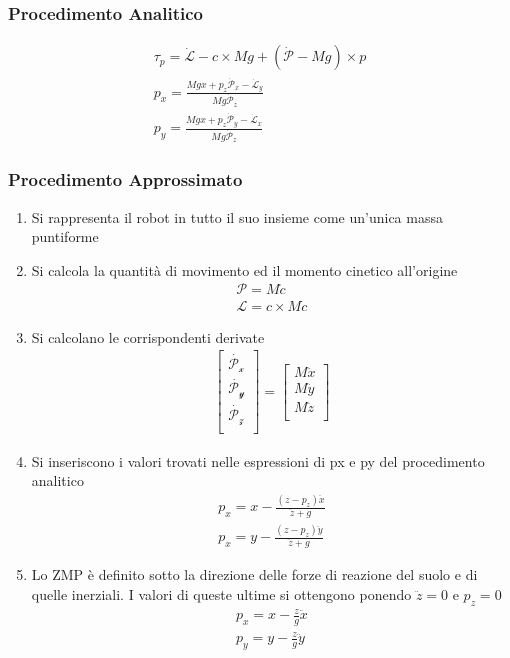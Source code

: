 \documentclass[a4paper,portrait,12pt]{article}
\theoremstyle{definition}
\begin{document}
\subsubsection{Procedimento Analitico}

\begin{align*}
\tau_p = \dot{\mathcal{L}} - c \times Mg + (\dot{\mathcal{P}} - Mg) \times p\\
p_x = \frac{Mgx + p_z\dot{\mathcal{P}}_x - \dot{\mathcal{L}}_y}{Mg \dot{\mathcal{P}}_z}\\
p_y = \frac{Mgx + p_z\dot{\mathcal{P}}_y - \dot{\mathcal{L}}_x}{Mg \dot{\mathcal{P}}_z}
\end{align*}

\subsubsection{Procedimento Approssimato}

\begin{enumerate}
\item Si rappresenta il robot in tutto il suo insieme come
un’unica massa puntiforme
\item Si calcola la quantità di movimento ed il momento
cinetico all’origine
\begin{align*}
\mathcal{P} = M \dot{c}\\
\mathcal{L} = c \times M \dot{c}
\end{align*}
\item Si calcolano le corrispondenti derivate
\begin{align*}
\left[\begin{array}{c}
\dot{\mathcal{P_x}}\\
\dot{\mathcal{P_y}}\\
\dot{\mathcal{P_z}}\\
\end{array}\right]
=
\left[\begin{array}{c}
M\ddot{x}\\
M\ddot{y}\\
M\ddot{z}\\
\end{array}\right]
\end{align*}
\item Si inseriscono i valori trovati nelle espressioni di px e py del
procedimento analitico
\begin{align*}
p_x = x - \frac{(z - p_z)\ddot{x}}{\ddot{z}+g}\\
p_x = y - \frac{(z - p_z)\ddot{y}}{\ddot{z}+g}
\end{align*}
\item Lo ZMP è definito sotto la direzione delle forze di reazione del
suolo e di quelle inerziali. I valori di queste ultime si ottengono
ponendo $\ddot{z} = 0$ e $p_z
= 0$
\begin{align*}
p_x = x - \frac{z}{g}\ddot{x}\\
p_y = y - \frac{z}{g}\ddot{y}
\end{align*}
\end{enumerate}
\end{document}
